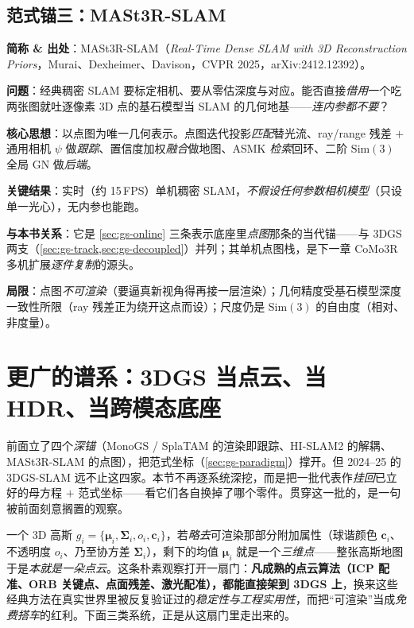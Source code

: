 \subsection{范式锚三：MASt3R-SLAM}

\begin{paper}
\textbf{简称 \& 出处}：MASt3R-SLAM（\emph{Real-Time Dense SLAM with 3D Reconstruction Priors}，Murai、Dexheimer、Davison，CVPR 2025，arXiv:2412.12392）\cite{murai2025mast3rslam}。

\textbf{问题}：经典稠密 SLAM 要标定相机、要从零估深度与对应。能否直接\emph{借用}一个吃两张图就吐逐像素 3D 点的基石模型当 SLAM 的几何地基——\emph{连内参都不要}？

\textbf{核心思想}：以点图为唯一几何表示。点图迭代投影\emph{匹配}替光流、ray/range 残差 $+$ 通用相机 $\psi$ 做\emph{跟踪}、置信度加权\emph{融合}做地图、ASMK \emph{检索}回环、二阶 $\mathrm{Sim}(3)$ 全局 GN 做\emph{后端}。

\textbf{关键结果}：实时（约 15\,FPS）单机稠密 SLAM，\emph{不假设任何参数相机模型}（只设单一光心），无内参也能跑。

\textbf{与本书关系}：它是 \cref{sec:gs-online} 三条表示底座里\emph{点图}那条的当代锚——与 3DGS 两支（\cref{sec:gs-track,sec:gs-decoupled}）并列；其单机点图栈，是下一章 CoMo3R 多机扩展\emph{逐件复制}的源头。

\textbf{局限}：点图\emph{不可渲染}（要逼真新视角得再接一层渲染）；几何精度受基石模型深度一致性所限（ray 残差正为绕开这点而设）；尺度仍是 $\mathrm{Sim}(3)$ 的自由度（相对、非度量）。
\end{paper}

\section{更广的谱系：3DGS 当点云、当 HDR、当跨模态底座}
\label{sec:gs-gallery}

前面立了四个\emph{深锚}（MonoGS / SplaTAM 的渲染即跟踪、HI-SLAM2 的解耦、MASt3R-SLAM 的点图），把范式坐标（\cref{sec:gs-paradigm}）撑开。但 2024--25 的 3DGS-SLAM 远不止这四家。本节不再逐系统深挖，而是把一批代表作\emph{挂回}已立好的母方程 $+$ 范式坐标——看它们各自换掉了哪个零件。贯穿这一批的，是一句被前面刻意搁置的观察。

\begin{insight}
一个 3D 高斯 $g_i=\{\boldsymbol\mu_i,\boldsymbol\Sigma_i,o_i,\mathbf c_i\}$，若\emph{略去}可渲染那部分附加属性（球谐颜色 $\mathbf c_i$、不透明度 $o_i$、乃至协方差 $\boldsymbol\Sigma_i$），剩下的均值 $\boldsymbol\mu_i$ 就是一个\emph{三维点}——整张高斯地图于是\emph{本就是一朵点云}。这条朴素观察打开一扇门：\textbf{凡成熟的点云算法（ICP 配准、ORB 关键点、点面残差、激光配准），都能直接架到 3DGS 上}，换来这些经典方法在真实世界里被反复验证过的\emph{稳定性与工程实用性}，而把“可渲染”当成\emph{免费搭车}的红利。下面三类系统，正是从这扇门里走出来的。
\end{insight}

